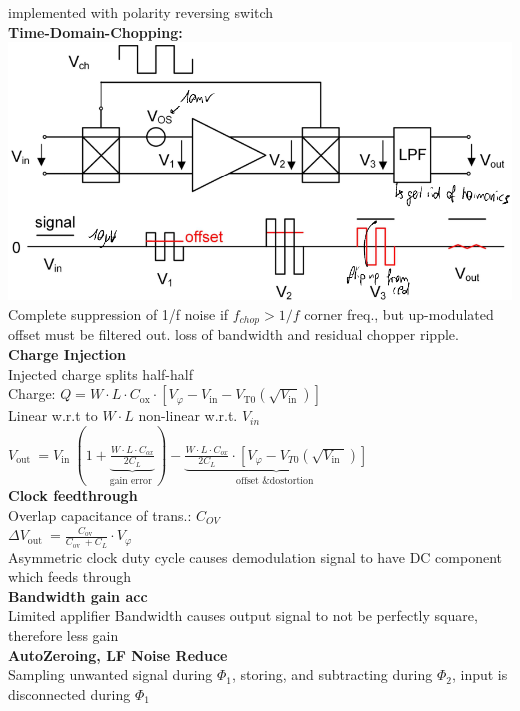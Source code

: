 \documentclass[5pt,landscape]{article}
\begin{document}
\begin{multicols*}{5}
implemented with polarity reversing switch\\
\textbf{Time-Domain-Chopping:}\\
\includegraphics[width=\columnwidth]{images/time_domain_chopping.png}\\
Complete suppression of 1/f noise if $ f_{chop} > 1/f $ corner freq., but up-modulated offset must be filtered out. loss of bandwidth and residual chopper ripple.
\textbf{Charge Injection}\\
Injected charge splits half-half\\
Charge: $ Q=W \cdot L \cdot C_{\mathrm{ox}} \cdot\left[V_{\varphi}-V_{\mathrm{in}}-V_{\mathrm{T} 0}\left(\sqrt{V_{\mathrm{in}}}\right)\right] $\\
Linear w.r.t to $ W\cdot L $ non-linear w.r.t. $ V_{in} $
$ V_{\text {out }}=V_{\text {in }}(1+\underbrace{\frac{W \cdot L \cdot C_{o x}}{2 C_{L}}}_{\text {gain error }})-\underbrace{\frac{W \cdot L \cdot C_{o x}}{2 C_{L}} \cdot\left[V_{\varphi}-V_{T 0}\left(\sqrt{V_{\text {in }}}\right)\right]}_{\text {offset \& dostortion }} $\\
\textbf{Clock feedthrough}\\
Overlap capacitance of trans.: $ C_{OV} $\\
$ \Delta V_{\text {out }}=\frac{C_{\text {ov }}}{C_{\text {ov }}+C_{L}} \cdot V_{\varphi} $\\
Asymmetric clock duty cycle causes demodulation signal to have DC component which feeds through\\
\textbf{Bandwidth gain acc}\\
Limited applifier Bandwidth causes output signal to not be perfectly square, therefore less gain\\
\textbf{AutoZeroing, LF Noise Reduce}\\
Sampling unwanted signal during $ \Phi_1 $, storing, and subtracting during $ \Phi_2 $, input is disconnected during $ \Phi_1 $

\end{multicols*}
\end{document}
